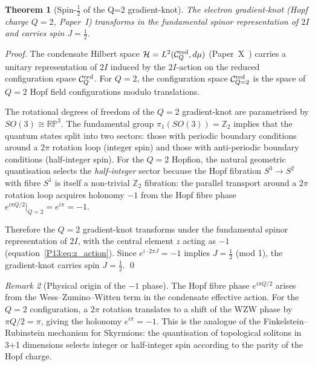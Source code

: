\documentclass[11pt,a4paper]{article}
\newtheorem{theorem}{Theorem}[section]
\theoremstyle{definition}
\theoremstyle{remark}
\newtheorem{remark}[theorem]{Remark}
\begin{document}
\begin{theorem}[Spin-$\tfrac{1}{2}$ of the Q=2 gradient-knot]
\label{P13:thm:spin_half}
The electron gradient-knot (Hopf charge $Q=2$, Paper~I) transforms
in the fundamental spinor representation of $2I$ and carries spin $J=\tfrac{1}{2}$.
\end{theorem}

\begin{proof}
The condensate Hilbert space $\mathcal{H}=L^2(\mathcal{C}_Q^{\rm red},d\mu)$
(Paper~X~\cite{Paper10}) carries a unitary representation of $2I$
induced by the $2I$-action on the reduced configuration space $\mathcal{C}_Q^{\rm red}$.
For $Q=2$, the configuration space $\mathcal{C}_{Q=2}^{\rm red}$ is the
space of $Q=2$ Hopf field configurations modulo translations.

The rotational degrees of freedom of the $Q=2$ gradient-knot
are parametrised by $SO(3)\cong\mathbb{RP}^3$.
The fundamental group $\pi_1(SO(3))=\mathbb{Z}_2$ implies
that the quantum states split into two sectors:
those with periodic boundary conditions around a $2\pi$ rotation loop
(integer spin) and those with anti-periodic boundary conditions
(half-integer spin).
For the $Q=2$ Hopfion, the natural geometric quantisation selects the
\emph{half-integer} sector because the Hopf fibration
$S^3\to S^2$ with fibre $S^1$ is itself a non-trivial $\mathbb{Z}_2$ fibration:
the parallel transport around a $2\pi$ rotation loop acquires holonomy $-1$
from the Hopf fibre phase $e^{i\pi Q/2}\big|_{Q=2}=e^{i\pi}=-1$.

Therefore the $Q=2$ gradient-knot transforms under the fundamental
spinor representation of $2I$, with the central element $z$ acting as $-1$
(equation~\eqref{P13:eq:z_action}).
Since $e^{i\cdot 2\pi J}=-1$ implies $J=\tfrac{1}{2}$ (mod 1),
the gradient-knot carries spin $J=\tfrac{1}{2}$.
\qed
\end{proof}

\begin{remark}[Physical origin of the $-1$ phase]
\label{P13:rem:hopf_phase}
The Hopf fibre phase $e^{i\pi Q/2}$ arises from the Wess--Zumino--Witten
term in the condensate effective action.
For the $Q=2$ configuration, a $2\pi$ rotation translates to a shift
of the WZW phase by $\pi Q/2 = \pi$, giving the holonomy $e^{i\pi}=-1$.
This is the analogue of the Finkelstein--Rubinstein mechanism for Skyrmions:
the quantisation of topological solitons in 3+1 dimensions selects
integer or half-integer spin according to the parity of the Hopf charge.
\end{remark}
\end{document}
